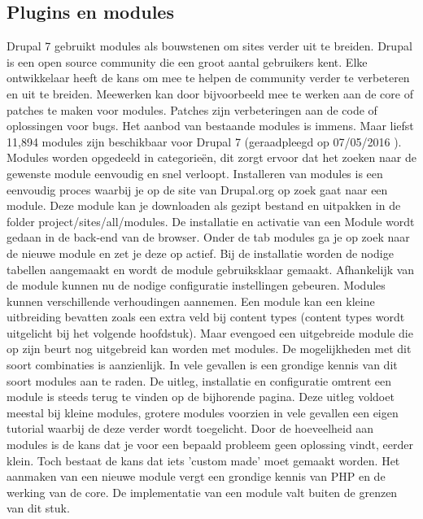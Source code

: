 \subsection{Plugins en modules}
Drupal 7 gebruikt modules als bouwstenen om sites verder uit te breiden. Drupal is een open source community die een groot aantal gebruikers kent. Elke ontwikkelaar heeft de kans om mee te helpen de community verder te verbeteren en uit te breiden. Meewerken kan door bijvoorbeeld mee te werken aan de core of patches te maken voor modules. Patches zijn verbeteringen aan de code of oplossingen voor bugs. 
\newline\newline
Het aanbod van bestaande modules is immens. Maar liefst 11,894 modules zijn beschikbaar voor Drupal 7 (geraadpleegd op 07/05/2016 \citep{Drupal.org2016DrupalModules}). Modules worden opgedeeld in categorieën, dit zorgt ervoor dat het zoeken naar de gewenste module  eenvoudig en snel verloopt. 
\newline\newline
Installeren van modules is een eenvoudig proces waarbij je op de site van Drupal.org op zoek gaat naar een module. Deze module kan je downloaden als gezipt bestand en uitpakken in de folder project/sites/all/modules. De installatie en activatie van een Module wordt gedaan in de back-end van de browser. Onder de tab modules ga je op zoek naar de nieuwe module en zet je deze op actief. Bij de installatie worden de nodige tabellen aangemaakt en wordt de module gebruiksklaar gemaakt. Afhankelijk van de module kunnen nu de nodige configuratie instellingen gebeuren. 
\newline\newline
Modules kunnen verschillende verhoudingen aannemen. Een module kan een kleine uitbreiding bevatten zoals een extra veld bij content types (content types wordt uitgelicht bij het volgende hoofdstuk). Maar evengoed een uitgebreide module die op zijn beurt nog uitgebreid kan worden met modules. De mogelijkheden met dit soort combinaties is aanzienlijk. In vele gevallen is een grondige kennis van dit soort modules aan te raden. 
\newline\newline
De uitleg, installatie en configuratie omtrent een module is steeds terug te vinden op de bijhorende pagina. Deze uitleg voldoet meestal bij kleine modules, grotere modules voorzien in vele gevallen een eigen tutorial waarbij de deze verder wordt toegelicht.
\newline\newline
Door de hoeveelheid aan modules is de kans dat je voor een bepaald probleem geen oplossing vindt, eerder klein. Toch bestaat de kans dat iets 'custom made' moet gemaakt worden. Het aanmaken van een nieuwe module vergt een grondige kennis van PHP en de werking van de core. De implementatie van een module valt buiten de grenzen van dit stuk. 
\pagebreak

